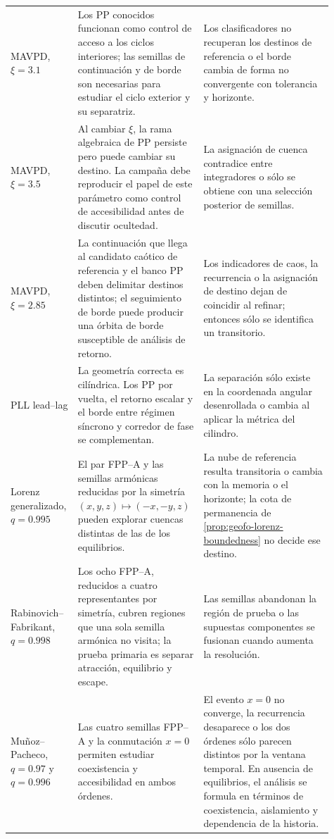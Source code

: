 \begin{longtable}{@{}p{0.17\linewidth}p{0.35\linewidth}p{0.39\linewidth}@{}}
MAVPD, \(\xi=3.1\)
& Los PP conocidos funcionan como control de acceso a los ciclos interiores;
  las semillas de continuación y de borde son necesarias para estudiar el
  ciclo exterior y su separatriz.
& Los clasificadores no recuperan los destinos de referencia o el borde cambia
  de forma no convergente con tolerancia y horizonte.\\

MAVPD, \(\xi=3.5\)
& Al cambiar \(\xi\), la rama algebraica de PP persiste pero puede cambiar su
  destino. La campaña debe reproducir el papel de este parámetro como control
  de accesibilidad antes de discutir ocultedad.
& La asignación de cuenca contradice entre integradores o sólo se obtiene con
  una selección posterior de semillas.\\

MAVPD, \(\xi=2.85\)
& La continuación que llega al candidato caótico de referencia y el banco PP
  deben delimitar destinos distintos; el seguimiento de borde puede producir
  una órbita de borde susceptible de análisis de retorno.
& Los indicadores de caos, la recurrencia o la asignación de destino dejan de
  coincidir al refinar; entonces sólo se identifica un transitorio.\\

PLL lead--lag
& La geometría correcta es cilíndrica. Los PP por vuelta, el retorno escalar y
  el borde entre régimen síncrono y corredor de fase se complementan.
& La separación sólo existe en la coordenada angular desenrollada o cambia al
  aplicar la métrica del cilindro.\\

Lorenz generalizado, \(q=0.995\)
& El par FPP--A y las semillas armónicas reducidas por la simetría
  \((x,y,z)\mapsto(-x,-y,z)\) pueden explorar cuencas distintas de las de los
  equilibrios.
& La nube de referencia resulta transitoria o cambia con la memoria o el
  horizonte; la cota de permanencia de \cref{prop:geofo-lorenz-boundedness}
  no decide ese destino.\\

Rabinovich--Fabrikant, \(q=0.998\)
& Los ocho FPP--A, reducidos a cuatro representantes por simetría, cubren
  regiones que una sola semilla armónica no visita; la prueba primaria es
  separar atracción, equilibrio y escape.
& Las semillas abandonan la región de prueba o las supuestas componentes se
  fusionan cuando aumenta la resolución.\\

Muñoz--Pacheco, \(q=0.97\) y \(q=0.996\)
& Las cuatro semillas FPP--A y la conmutación \(x=0\) permiten estudiar
  coexistencia y accesibilidad en ambos órdenes.
& El evento \(x=0\) no converge, la recurrencia desaparece o los dos órdenes
  sólo parecen distintos por la ventana temporal. En ausencia de equilibrios,
  el análisis se formula en términos de coexistencia, aislamiento y dependencia
  de la historia.\\
\bottomrule
\end{longtable}

